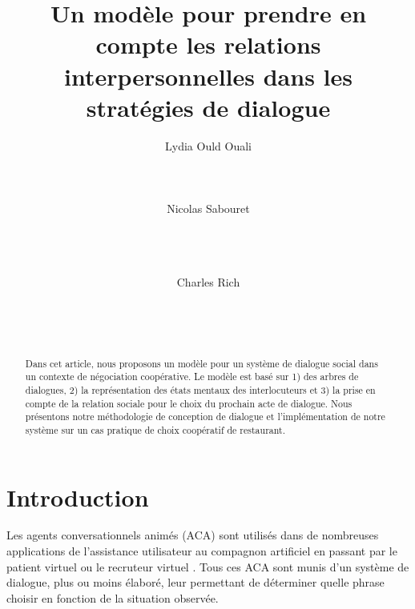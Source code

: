 \documentclass [french]{sig-alternate-05-2015}
\begin{document}
 

\title{Un modèle pour prendre en compte les relations interpersonnelles dans les stratégies de dialogue}


\author{
\alignauthor Lydia Ould Ouali\\
       \\
       \\
       \\
\alignauthor Nicolas Sabouret\\
       \\
       \\
       \\
        \and
\alignauthor Charles Rich\\
       \\
       \\
       \\
}


\maketitle
\begin{abstract}
\par Dans cet article, nous proposons un modèle pour un système de dialogue social dans un contexte de négociation coopérative. Le modèle est basé sur 1) des arbres de dialogues, 2) la représentation des états mentaux des interlocuteurs et 3) la prise en compte de la relation sociale pour le choix du prochain acte de dialogue. Nous présentons notre méthodologie de conception de dialogue et l'implémentation de notre système sur un cas pratique de choix coopératif de restaurant.
\end{abstract}



\section{Introduction}


Les agents conversationnels animés (ACA) sont utilisés dans de nombreuses applications de l'assistance utilisateur \cite{sidner2013always} au compagnon artificiel \cite{sidner2013always, riviere2014aca} en passant par le patient virtuel \cite{annesysteme} ou le recruteur virtuel \cite{jones2012affective}. Tous ces ACA sont munis d'un système de dialogue, plus ou moins élaboré, leur permettant de déterminer quelle phrase choisir en fonction de la situation observée.
\end{document}
